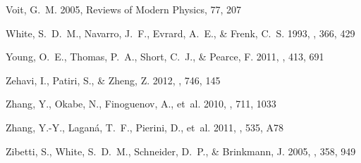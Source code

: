 \documentclass{aa}
\begin{document}
\begin{thebibliography}{61}
{Voit}, G.~M. 2005, Reviews of Modern Physics, 77, 207

{White}, S.~D.~M., {Navarro}, J.~F., {Evrard}, A.~E., \& {Frenk}, C.~S. 1993,
  \nat, 366, 429

{Young}, O.~E., {Thomas}, P.~A., {Short}, C.~J., \& {Pearce}, F. 2011, \mnras,
  413, 691

{Zehavi}, I., {Patiri}, S., \& {Zheng}, Z. 2012, \apj, 746, 145

{Zhang}, Y., {Okabe}, N., {Finoguenov}, A., {et~al.} 2010, \apj, 711, 1033

{Zhang}, Y.-Y., {Lagan{\'a}}, T.~F., {Pierini}, D., {et~al.} 2011, \aap, 535,
  A78

{Zibetti}, S., {White}, S.~D.~M., {Schneider}, D.~P., \& {Brinkmann}, J. 2005,
  \mnras, 358, 949

\end{thebibliography}
\end{document}
